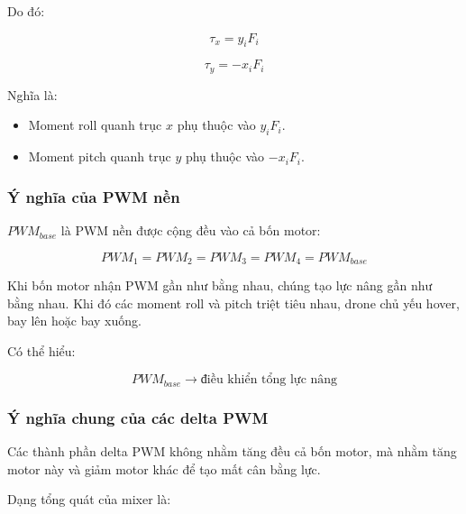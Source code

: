 Do đó:

\begin{equation}
    \tau_x = y_iF_i
\end{equation}

\begin{equation}
    \tau_y = -x_iF_i
\end{equation}

Nghĩa là:
\begin{itemize}
    \item Moment roll quanh trục $x$ phụ thuộc vào $y_iF_i$.
    \item Moment pitch quanh trục $y$ phụ thuộc vào $-x_iF_i$.
\end{itemize}

\subsubsection{Ý nghĩa của PWM nền}

$PWM_{base}$ là PWM nền được cộng đều vào cả bốn motor:

\begin{equation}
    PWM_1 = PWM_2 = PWM_3 = PWM_4 = PWM_{base}
\end{equation}

Khi bốn motor nhận PWM gần như bằng nhau, chúng tạo lực nâng gần như bằng nhau.
Khi đó các moment roll và pitch triệt tiêu nhau, drone chủ yếu hover, bay lên
hoặc bay xuống.

Có thể hiểu:

\begin{equation}
    PWM_{base}
    \rightarrow
    \text{điều khiển tổng lực nâng}
\end{equation}

\subsubsection{Ý nghĩa chung của các delta PWM}

Các thành phần delta PWM không nhằm tăng đều cả bốn motor, mà nhằm tăng motor
này và giảm motor khác để tạo mất cân bằng lực.

Dạng tổng quát của mixer là:

